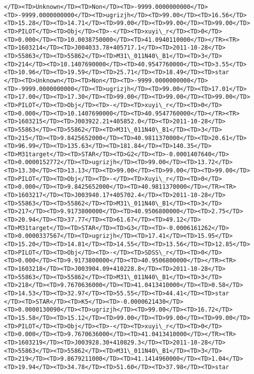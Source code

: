 \documentclass[11pt]{article}
\begin{document}
\begin{Verbatim}[commandchars=\\\{\}]
</TD><TD>Unknown</TD><TD>Non</TD><TD>-9999.0000000000</TD><TD>-9999.0000000000</TD><TD>ugrizjh</TD><TD>99.00</TD><TD>16.56</TD><TD>15.28</TD><TD>14.71</TD><TD>99.00</TD><TD>99.00</TD><TD>99.00</TD><TD>PILOT</TD><TD>Obj</TD><TD>-</TD><TD>xuyi\_r</TD><TD>0</TD><TD>0.000</TD><TD>10.0038750000</TD><TD>41.0940110000</TD></TR><TR><TD>1603214</TD><TD>J004033.78+405717.1</TD><TD>2011-10-28</TD><TD>55863</TD><TD>55862</TD><TD>M31\_011N40\_B1</TD><TD>3</TD><TD>214</TD><TD>10.1407690000</TD><TD>40.9547760000</TD><TD>3.55</TD><TD>10.96</TD><TD>19.59</TD><TD>25.71</TD><TD>18.49</TD><TD>star     </TD><TD>Unknown</TD><TD>Non</TD><TD>-9999.0000000000</TD><TD>-9999.0000000000</TD><TD>ugrizjh</TD><TD>99.00</TD><TD>17.01</TD><TD>17.00</TD><TD>17.30</TD><TD>99.00</TD><TD>99.00</TD><TD>99.00</TD><TD>PILOT</TD><TD>Obj</TD><TD>-</TD><TD>xuyi\_r</TD><TD>0</TD><TD>0.000</TD><TD>10.1407690000</TD><TD>40.9547760000</TD></TR><TR><TD>1603215</TD><TD>J003922.21+405852.0</TD><TD>2011-10-28</TD><TD>55863</TD><TD>55862</TD><TD>M31\_011N40\_B1</TD><TD>3</TD><TD>215</TD><TD>9.8425652000</TD><TD>40.9811370000</TD><TD>20.61</TD><TD>96.99</TD><TD>135.63</TD><TD>181.84</TD><TD>140.35</TD><TD>M31target</TD><TD>STAR</TD><TD>G2</TD><TD>-0.0001407640</TD><TD>0.0000152772</TD><TD>ugrizjh</TD><TD>99.00</TD><TD>13.72</TD><TD>13.30</TD><TD>13.13</TD><TD>99.00</TD><TD>99.00</TD><TD>99.00</TD><TD>PILOT</TD><TD>Obj</TD><TD>-</TD><TD>Xuyi\_r</TD><TD>0</TD><TD>0.000</TD><TD>9.8425652000</TD><TD>40.9811370000</TD></TR><TR><TD>1603217</TD><TD>J003940.17+405702.4</TD><TD>2011-10-28</TD><TD>55863</TD><TD>55862</TD><TD>M31\_011N40\_B1</TD><TD>3</TD><TD>217</TD><TD>9.9173800000</TD><TD>40.9506800000</TD><TD>2.75</TD><TD>20.94</TD><TD>37.77</TD><TD>61.67</TD><TD>49.12</TD><TD>M31target</TD><TD>STAR</TD><TD>G3</TD><TD>-0.0006161262</TD><TD>0.0000337567</TD><TD>ugrizjh</TD><TD>17.41</TD><TD>15.95</TD><TD>15.20</TD><TD>14.81</TD><TD>14.55</TD><TD>13.56</TD><TD>12.85</TD><TD>PILOT</TD><TD>Obj</TD><TD>-</TD><TD>SDSS\_r</TD><TD>0</TD><TD>0.000</TD><TD>9.9173800000</TD><TD>40.9506800000</TD></TR><TR><TD>1603218</TD><TD>J003904.09+410228.8</TD><TD>2011-10-28</TD><TD>55863</TD><TD>55862</TD><TD>M31\_011N40\_B1</TD><TD>3</TD><TD>218</TD><TD>9.7670636000</TD><TD>41.0413410000</TD><TD>0.58</TD><TD>14.53</TD><TD>32.97</TD><TD>55.55</TD><TD>44.41</TD><TD>star     </TD><TD>STAR</TD><TD>K5</TD><TD>-0.0000621430</TD><TD>0.0000130090</TD><TD>ugrizjh</TD><TD>99.00</TD><TD>16.72</TD><TD>15.58</TD><TD>15.12</TD><TD>99.00</TD><TD>99.00</TD><TD>99.00</TD><TD>PILOT</TD><TD>Obj</TD><TD>-</TD><TD>xuyi\_r</TD><TD>0</TD><TD>0.000</TD><TD>9.7670636000</TD><TD>41.0413410000</TD></TR><TR><TD>1603219</TD><TD>J003928.30+410829.3</TD><TD>2011-10-28</TD><TD>55863</TD><TD>55862</TD><TD>M31\_011N40\_B1</TD><TD>3</TD><TD>219</TD><TD>9.8679211000</TD><TD>41.1414960000</TD><TD>1.04</TD><TD>19.94</TD><TD>34.78</TD><TD>51.60</TD><TD>37.98</TD><TD>star     
\end{Verbatim}
\end{document}
